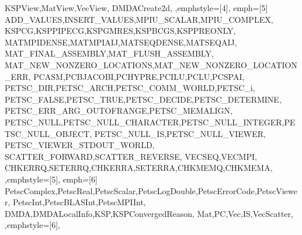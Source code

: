 {{    KSPView,MatView,VecView,
    DMDACreate2d,
  },emphstyle={[4]\color{red!70!black}\bfseries},
  emph={[5] %
    ADD_VALUES,INSERT_VALUES,MPIU_SCALAR,MPIU_COMPLEX,
    KSPCG,KSPPIPECG,KSPGMRES,KSPBCGS,KSPPREONLY,
    MATMPIDENSE,MATMPIAIJ,MATSEQDENSE,MATSEQAIJ,
    MAT_FINAL_ASSEMBLY,MAT_FLUSH_ASSEMBLY,
    MAT_NEW_NONZERO_LOCATIONS,MAT_NEW_NONZERO_LOCATION_ERR,
    PCASM,PCBJACOBI,PCHYPRE,PCILU,PCLU,PCSPAI,
    PETSC_DIR,PETSC_ARCH,PETSC_COMM_WORLD,PETSC_i,
    PETSC_FALSE,PETSC_TRUE,PETSC_DECIDE,PETSC_DETERMINE,
    PETSC_ERR_ARG_OUTOFRANGE,PETSC_MEMALIGN,
    PETSC_NULL,PETSC_NULL_CHARACTER,PETSC_NULL_INTEGER,PETSC_NULL_OBJECT,
    PETSC_NULL_IS,PETSC_NULL_VIEWER,
    PETSC_VIEWER_STDOUT_WORLD,
    SCATTER_FORWARD,SCATTER_REVERSE,
    VECSEQ,VECMPI,
    CHKERRQ,SETERRQ,CHKERRA,SETERRA,CHKMEMQ,CHKMEMA,
  },emphstyle={[5]\color{green!60!black}},
  emph={[6] %
    PetscComplex,PetscReal,PetscScalar,PetscLogDouble,PetscErrorCode,PetscViewer,
    PetscInt,PetscBLASInt,PetscMPIInt,
    DMDA,DMDALocalInfo,KSP,KSPConvergedReason,
    Mat,PC,Vec,IS,VecScatter,
  },emphstyle={[6]\bfseries\color{blue}},
}
